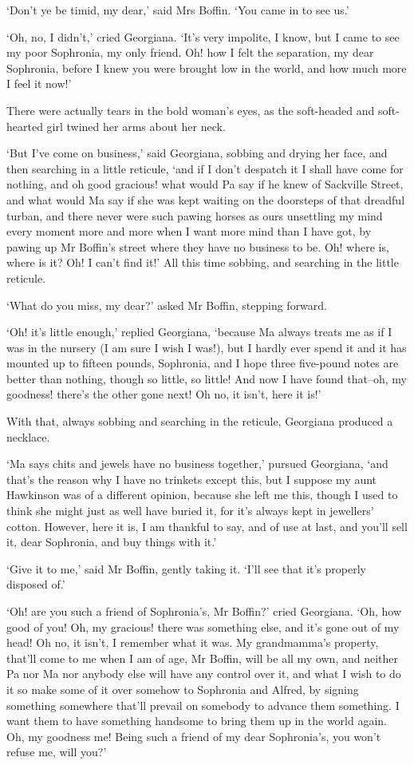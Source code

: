 ‘Don’t ye be timid, my dear,’ said Mrs Boffin. ‘You came in to see us.’

‘Oh, no, I didn’t,’ cried Georgiana. ‘It’s very impolite, I know, but
I came to see my poor Sophronia, my only friend. Oh! how I felt the
separation, my dear Sophronia, before I knew you were brought low in the
world, and how much more I feel it now!’

There were actually tears in the bold woman’s eyes, as the soft-headed
and soft-hearted girl twined her arms about her neck.

‘But I’ve come on business,’ said Georgiana, sobbing and drying her
face, and then searching in a little reticule, ‘and if I don’t despatch
it I shall have come for nothing, and oh good gracious! what would Pa
say if he knew of Sackville Street, and what would Ma say if she was
kept waiting on the doorsteps of that dreadful turban, and there never
were such pawing horses as ours unsettling my mind every moment more
and more when I want more mind than I have got, by pawing up Mr Boffin’s
street where they have no business to be. Oh! where is, where is it?
Oh! I can’t find it!’ All this time sobbing, and searching in the little
reticule.

‘What do you miss, my dear?’ asked Mr Boffin, stepping forward.

‘Oh! it’s little enough,’ replied Georgiana, ‘because Ma always treats
me as if I was in the nursery (I am sure I wish I was!), but I hardly
ever spend it and it has mounted up to fifteen pounds, Sophronia, and I
hope three five-pound notes are better than nothing, though so little,
so little! And now I have found that--oh, my goodness! there’s the other
gone next! Oh no, it isn’t, here it is!’

With that, always sobbing and searching in the reticule, Georgiana
produced a necklace.

‘Ma says chits and jewels have no business together,’ pursued Georgiana,
‘and that’s the reason why I have no trinkets except this, but I suppose
my aunt Hawkinson was of a different opinion, because she left me this,
though I used to think she might just as well have buried it, for it’s
always kept in jewellers’ cotton. However, here it is, I am thankful
to say, and of use at last, and you’ll sell it, dear Sophronia, and buy
things with it.’

‘Give it to me,’ said Mr Boffin, gently taking it. ‘I’ll see that it’s
properly disposed of.’

‘Oh! are you such a friend of Sophronia’s, Mr Boffin?’ cried Georgiana.
‘Oh, how good of you! Oh, my gracious! there was something else, and
it’s gone out of my head! Oh no, it isn’t, I remember what it was. My
grandmamma’s property, that’ll come to me when I am of age, Mr Boffin,
will be all my own, and neither Pa nor Ma nor anybody else will have
any control over it, and what I wish to do it so make some of it over
somehow to Sophronia and Alfred, by signing something somewhere that’ll
prevail on somebody to advance them something. I want them to have
something handsome to bring them up in the world again. Oh, my goodness
me! Being such a friend of my dear Sophronia’s, you won’t refuse me,
will you?’

